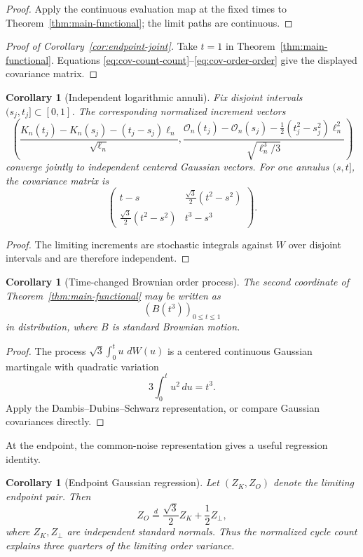 \documentclass[11pt]{article}
\newtheorem{corollary}[theorem]{Corollary}
\theoremstyle{definition}
\theoremstyle{remark}
\newcommand{\dd}{\,d}
\newcommand{\cO}{\mathcal O}
\begin{document}
\begin{proof}
Apply the continuous evaluation map at the fixed times to
Theorem~\ref{thm:main-functional}; the limit paths are continuous.
\end{proof}

\begin{proof}[Proof of Corollary~\ref{cor:endpoint-joint}]
Take $t=1$ in Theorem~\ref{thm:main-functional}.  Equations
\eqref{eq:cov-count-count}--\eqref{eq:cov-order-order} give the displayed
covariance matrix.
\end{proof}

\begin{corollary}[Independent logarithmic annuli]
\label{cor:annuli}
Fix disjoint intervals $(s_j,t_j]\subset[0,1]$.  The corresponding normalized
increment vectors
\[
 \left(
 \frac{K_n(t_j)-K_n(s_j)-(t_j-s_j)\ell_n}{\sqrt{\ell_n}},
 \frac{\cO_n(t_j)-\cO_n(s_j)-\frac12(t_j^2-s_j^2)\ell_n^2}
      {\sqrt{\ell_n^3/3}}
 \right)
\]
converge jointly to independent centered Gaussian vectors.  For one annulus
$(s,t]$, the covariance matrix is
\[
 \begin{pmatrix}
 t-s&\frac{\sqrt3}{2}(t^2-s^2)\\[1mm]
 \frac{\sqrt3}{2}(t^2-s^2)&t^3-s^3
 \end{pmatrix}.
\]
\end{corollary}

\begin{proof}
The limiting increments are stochastic integrals against $W$ over disjoint
intervals and are therefore independent.
\end{proof}

\begin{corollary}[Time-changed Brownian order process]
\label{cor:time-change}
The second coordinate of Theorem~\ref{thm:main-functional} may be written as
\[
 \left(B(t^3)\right)_{0\le t\le1}
\]
in distribution, where $B$ is standard Brownian motion.
\end{corollary}

\begin{proof}
The process $\sqrt3\int_0^tu\,\dd W(u)$ is a centered continuous Gaussian
martingale with quadratic variation
\[
 3\int_0^t u^2\dd u=t^3.
\]
Apply the Dambis--Dubins--Schwarz representation, or compare Gaussian
covariances directly.
\end{proof}

At the endpoint, the common-noise representation gives a useful regression
identity.

\begin{corollary}[Endpoint Gaussian regression]
\label{cor:regression}
Let $(Z_K,Z_O)$ denote the limiting endpoint pair.  Then
\[
 Z_O\stackrel d=\frac{\sqrt3}{2}Z_K+\frac12Z_\perp,
\]
where $Z_K,Z_\perp$ are independent standard normals.  Thus the normalized
cycle count explains three quarters of the limiting order variance.
\end{corollary}
\end{document}
